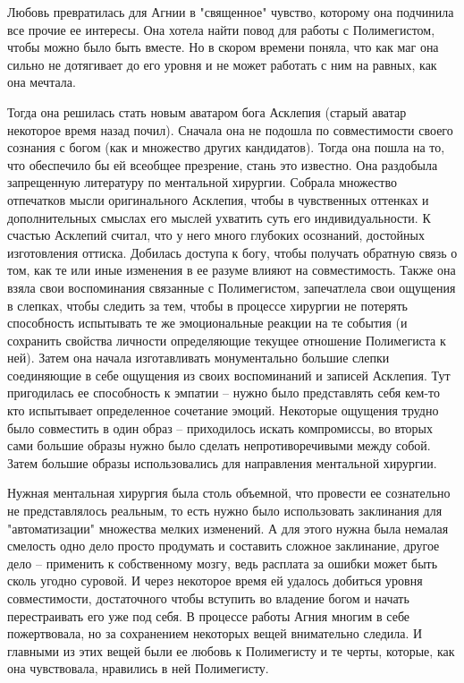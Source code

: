 \documentclass[12pt,a4paper]{article}
\begin{document}
Любовь превратилась для Агнии в "священное" чувство, которому она подчинила все прочие ее интересы. Она хотела найти повод для работы с Полимегистом, чтобы можно было быть вместе. Но в скором времени поняла, что как маг она сильно не дотягивает до его уровня и не может работать с ним на равных, как она мечтала.

Тогда она решилась стать новым аватаром бога Асклепия (старый аватар некоторое время назад почил). Сначала она не подошла по совместимости своего сознания с богом (как и множество других кандидатов). Тогда она пошла на то, что обеспечило бы ей всеобщее презрение, стань это известно. Она раздобыла запрещенную литературу по ментальной хирургии. Собрала множество отпечатков мысли оригинального Асклепия, чтобы в чувственных оттенках и дополнительных смыслах его мыслей ухватить суть его индивидуальности. К счастью Асклепий считал, что у него много глубоких осознаний, достойных изготовления оттиска. Добилась доступа к богу, чтобы получать обратную связь о том, как те или иные изменения в ее разуме влияют на совместимость. Также она взяла свои воспоминания связанные с Полимегистом, запечатлела свои ощущения в слепках, чтобы следить за тем, чтобы в процессе хирургии не потерять способность испытывать те же эмоциональные реакции на те события (и сохранить свойства личности определяющие текущее отношение Полимегиста к ней). Затем она начала изготавливать монументально большие слепки соединяющие в себе ощущения из своих воспоминаний и записей Асклепия. Тут пригодилась ее способность к эмпатии -- нужно было представлять себя кем-то кто испытывает определенное сочетание эмоций. Некоторые ощущения трудно было совместить в один образ -- приходилось искать компромиссы, во вторых сами большие образы нужно было сделать непротиворечивыми между собой. Затем большие образы использовались для направления ментальной хирургии.

Нужная ментальная хирургия была столь объемной, что провести ее сознательно не представлялось реальным, то есть нужно было использовать заклинания для "автоматизации" множества мелких изменений. А для этого нужна была немалая смелость одно дело просто продумать и составить сложное заклинание, другое дело -- применить к собственному мозгу, ведь расплата за ошибки может быть сколь угодно суровой. И через некоторое время ей удалось добиться уровня совместимости, достаточного чтобы вступить во владение богом и начать перестраивать его уже под себя. В процессе работы Агния многим в себе пожертвовала, но за сохранением некоторых вещей внимательно следила. И главными из этих вещей были ее любовь к Полимегисту и те черты, которые, как она чувствовала, нравились в ней Полимегисту.
\end{document}
